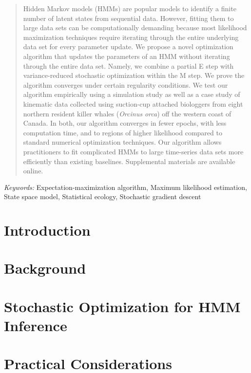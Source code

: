 \documentclass[11pt]{article}
\begin{document}
\bigskip
\begin{abstract}
    Hidden Markov models (HMMs) are popular models to identify a finite number of latent states from sequential data. However, fitting them to large data sets can be computationally demanding because most likelihood maximization techniques require iterating through the entire underlying data set for every parameter update. We propose a novel optimization algorithm that updates the parameters of an HMM without iterating through the entire data set. Namely, we combine a partial E step with variance-reduced stochastic optimization within the M step. We prove the algorithm converges under certain regularity conditions. We test our algorithm empirically using a simulation study as well as a case study of kinematic data collected using suction-cup attached biologgers from eight northern resident killer whales ({\em{Orcinus orca}}) off the western coast of Canada. In both, our algorithm converges in fewer epochs, with less computation time, and to regions of higher likelihood compared to standard numerical optimization techniques. Our algorithm allows practitioners to fit complicated HMMs to large time-series data sets more efficiently than existing baselines. Supplemental materials are available online.
\end{abstract}

\noindent
{\it Keywords:} Expectation-maximization algorithm, Maximum likelihood estimation, State space model, Statistical ecology, Stochastic gradient descent
\vfill 

\newpage
{} %

\section{Introduction}


\section{Background}


\section{Stochastic Optimization for HMM Inference}


\section{Practical Considerations}

\label{sec:prac}
\end{document}
